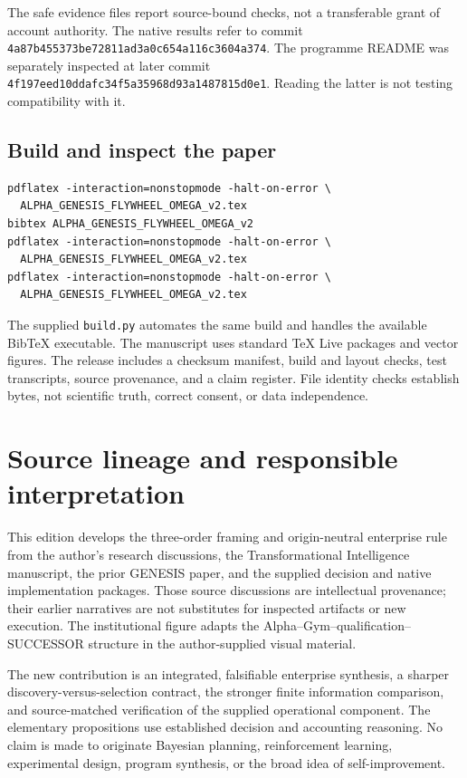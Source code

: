 \documentclass[11pt,letterpaper]{article}
\theoremstyle{remark}\newtheorem{remark}{Remark}[section]
\begin{document}
The safe evidence files report source-bound checks, not a transferable grant of account authority. The native results refer to commit \texttt{4a87b455373be72811ad3a0c654a116c3604a374}. The programme README was separately inspected at later commit \texttt{4f197eed10ddafc34f5a35968d93a1487815d0e1}. Reading the latter is not testing compatibility with it.

\subsection{Build and inspect the paper}
\begin{lstlisting}
pdflatex -interaction=nonstopmode -halt-on-error \
  ALPHA_GENESIS_FLYWHEEL_OMEGA_v2.tex
bibtex ALPHA_GENESIS_FLYWHEEL_OMEGA_v2
pdflatex -interaction=nonstopmode -halt-on-error \
  ALPHA_GENESIS_FLYWHEEL_OMEGA_v2.tex
pdflatex -interaction=nonstopmode -halt-on-error \
  ALPHA_GENESIS_FLYWHEEL_OMEGA_v2.tex
\end{lstlisting}
The supplied \texttt{build.py} automates the same build and handles the available BibTeX executable. The manuscript uses standard TeX Live packages and vector figures. The release includes a checksum manifest, build and layout checks, test transcripts, source provenance, and a claim register. File identity checks establish bytes, not scientific truth, correct consent, or data independence.

\section{Source lineage and responsible interpretation}
This edition develops the three-order framing and origin-neutral enterprise rule from the author's research discussions, the Transformational Intelligence manuscript, the prior GENESIS paper, and the supplied decision and native implementation packages. Those source discussions are intellectual provenance; their earlier narratives are not substitutes for inspected artifacts or new execution. The institutional figure adapts the Alpha--Gym--qualification--SUCCESSOR structure in the author-supplied visual material.

The new contribution is an integrated, falsifiable enterprise synthesis, a sharper discovery-versus-selection contract, the stronger finite information comparison, and source-matched verification of the supplied operational component. The elementary propositions use established decision and accounting reasoning. No claim is made to originate Bayesian planning, reinforcement learning, experimental design, program synthesis, or the broad idea of self-improvement.
\end{document}
